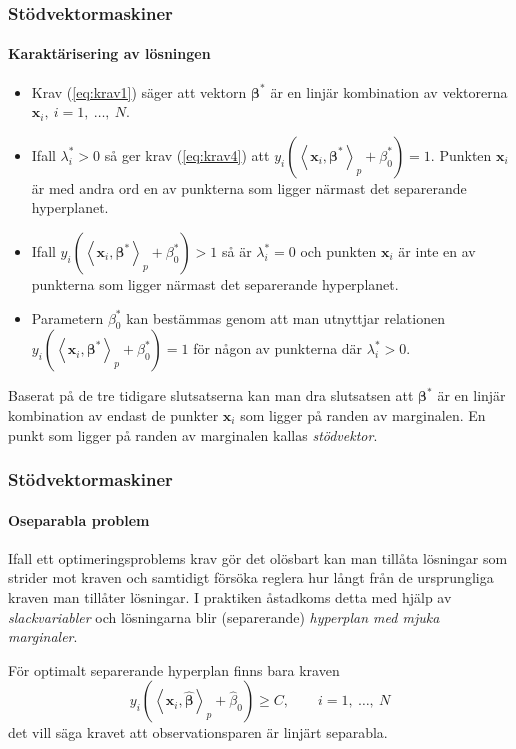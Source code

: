 \documentclass{beamer}
\theoremstyle{definition}
\theoremstyle{remark}
\newcommand{\bfbeta}{{\boldsymbol{\beta}}}
\newcommand{\bfx}{\mathbf{x}}
\newcommand{\llangle}{\left\langle}
\newcommand{\rrangle}{\right\rangle}
\newcommand{\inner}[2]{\llangle #1, #2 \rrangle}
\begin{document}
\begin{frame}
\frametitle{Stödvektormaskiner}
\framesubtitle{Karaktärisering av lösningen}
\begin{itemize}
	\item Krav (\ref{eq:krav1}) säger att vektorn $\bfbeta^*$ är en linjär kombination av vektorerna $\mathbf{x}_i,~i=1,~\dots,~N$.
	\item Ifall $\lambda^*_i > 0$ så ger krav (\ref{eq:krav4}) att $y_i\left(\inner{\bfx_i}{\bfbeta^*}_p+\beta^*_0\right) = 1$. Punkten $\mathbf{x}_i$ är med andra ord en av punkterna som ligger närmast det separerande hyperplanet.
	\item Ifall $y_i\left(\inner{\bfx_i}{\bfbeta^*}_p + \beta^*_0\right) > 1$ så är $\lambda^*_i = 0$ och punkten $\mathbf{x}_i$ är inte en av punkterna som ligger närmast det separerande hyperplanet.
	\item Parametern $\beta^*_0$ kan bestämmas genom att man utnyttjar relationen $y_i\left(\inner{\bfx_i}{\bfbeta^*}_p + \beta^*_0\right) = 1$ för någon av punkterna där $\lambda^*_i > 0$.
\end{itemize}
Baserat på de tre tidigare slutsatserna kan man dra slutsatsen att $\bfbeta^*$ är en linjär kombination av endast de punkter $\mathbf{x}_{i}$ som ligger på randen av marginalen. En punkt som ligger på randen av marginalen kallas \emph{stödvektor}.
\end{frame}

\begin{frame}
\frametitle{Stödvektormaskiner}
\framesubtitle{Oseparabla problem}
Ifall ett optimeringsproblems krav gör det olösbart kan man tillåta lösningar som strider mot kraven och samtidigt försöka reglera hur långt från de ursprungliga kraven man tillåter lösningar. I praktiken åstadkoms detta med hjälp av \emph{slackvariabler} och lösningarna blir (separerande) \emph{hyperplan med mjuka marginaler}.

För optimalt separerande hyperplan finns bara kraven
\begin{equation*}
	y_i\left(\inner{\bfx_i}{\widehat{\bfbeta}}_p+\widehat{\beta}_0\right) \geq C, \qquad i=1,~\dots,~N
\end{equation*}
det vill säga kravet att observationsparen är linjärt separabla.
\end{frame}
\end{document}
